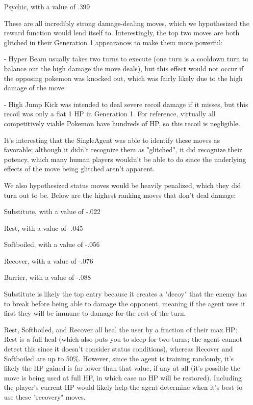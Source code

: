 \documentclass{article}
\begin{document}
\quad\quad Psychic, with a value of .399

\quad These are all incredibly strong damage-dealing moves, which we hypothesized the reward function would lend itself to. Interestingly, the top two moves are both glitched in their Generation 1 appearances to make them more powerful:

\quad\quad - Hyper Beam usually takes two turns to execute (one turn is a cooldown turn to balance out the high damage the move deals), but this effect would not occur if the opposing pokemon was knocked out, which was fairly likely due to the high damage of the move.

\quad\quad - High Jump Kick was intended to deal severe recoil damage if it misses, but this recoil was only a flat 1 HP in Generation 1. For reference, virtually all competitively viable Pokemon have hundreds of HP, so this recoil is negligible.

\quad It's interesting that the SingleAgent was able to identify these moves as favorable; although it didn't recognize them as "glitched", it did recognize their potency, which many human players wouldn't be able to do since the underlying effects of the move being glitched aren't apparent.

\quad We also hypothesized status moves would be heavily penalized, which they did turn out to be. Below are the highest ranking moves that don't deal damage:

\quad\quad Substitute, with a value of -.022

\quad\quad Rest, with a value of -.045

\quad\quad Softboiled, with a value of -.056

\quad\quad Recover, with a value of -.076

\quad\quad Barrier, with a value of -.088

\quad Substitute is likely the top entry because it creates a "decoy" that the enemy has to break before being able to damage the opponent, meaning if the agent uses it first they will be immune to damage for the rest of the turn.

\quad Rest, Softboiled, and Recover all heal the user by a fraction of their max HP; Rest is a full heal (which also puts you to sleep for two turns; the agent cannot detect this since it doesn't consider status conditions), whereas Recover and Softboiled are up to 50\%. However, since the agent is training randomly, it's likely the HP gained is far lower than that value, if any at all (it's possible the move is being used at full HP, in which case no HP will be restored). Including the player's current HP would likely help the agent determine when it's best to use these "recovery" moves.
\end{document}

